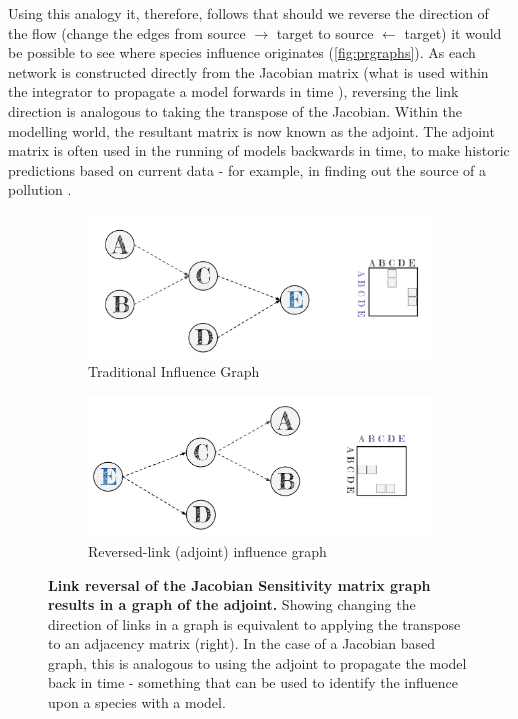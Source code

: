 Using this analogy it, therefore, follows that should we reverse the direction of the flow (change the edges from source $\rightarrow$ target to source $\leftarrow$ target) it would be possible to see where species influence originates (\autoref{fig:prgraphs}). As each network is constructed directly from the Jacobian matrix (what is used within the integrator to propagate a model forwards in time ), reversing the link direction is analogous to taking the transpose of the Jacobian. Within the modelling world, the resultant matrix is now known as the adjoint. The adjoint matrix is often used in the running of models backwards in time, to make historic predictions based on current data - for example, in finding out the source of a pollution \citep{adjgeos}.

\begin{figure}[H]
    \centering
\begin{subfigure}{.9\textwidth}
  \centering
  \includegraphics[width=\textwidth]{figures_c3/traditional.pdf}
  \caption{Traditional Influence Graph}
\end{subfigure}

\begin{subfigure}{.9\textwidth }
  \centering
  \includegraphics[width=\textwidth]{figures_c3/adjoint.pdf}
  \caption{Reversed-link (adjoint) influence graph}
\end{subfigure}

\caption{\textbf{Link reversal of the Jacobian Sensitivity matrix graph results in a graph of the adjoint.} Showing changing the direction of links in a graph is equivalent to applying the transpose to an adjacency matrix (right). In the case of a Jacobian based graph, this is analogous to using the adjoint to propagate the model back in time - something that can be used to identify the influence upon a species with a model.}
  \label{fig:prgraphs}
\end{figure}




